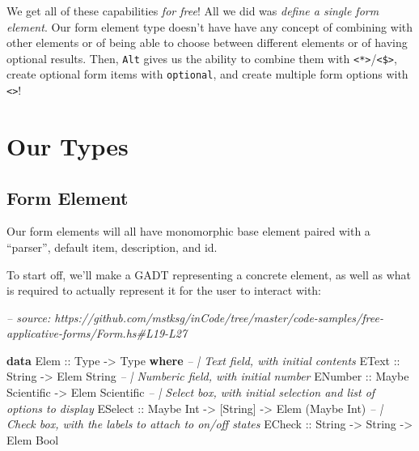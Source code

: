 \documentclass[]{article}
\newenvironment{Shaded}{}{}
\newcommand{\CommentTok}[1]{\textcolor[rgb]{0.38,0.63,0.69}{\textit{#1}}}
\newcommand{\DataTypeTok}[1]{\textcolor[rgb]{0.56,0.13,0.00}{#1}}
\newcommand{\KeywordTok}[1]{\textcolor[rgb]{0.00,0.44,0.13}{\textbf{#1}}}
\newcommand{\NormalTok}[1]{#1}
\newcommand{\OtherTok}[1]{\textcolor[rgb]{0.00,0.44,0.13}{#1}}
\begin{document}
We get all of these capabilities \emph{for free}! All we did was \emph{define a
single form element}. Our form element type doesn't have have any concept of
combining with other elements or of being able to choose between different
elements or of having optional results. Then, \texttt{Alt} gives us the ability
to combine them with
\texttt{\textless{}*\textgreater{}}/\texttt{\textless{}\$\textgreater{}}, create
optional form items with \texttt{optional}, and create multiple form options
with \texttt{\textless{}\textbar{}\textgreater{}}!

\hypertarget{our-types}{%
\section{Our Types}\label{our-types}}

\hypertarget{form-element}{%
\subsection{Form Element}\label{form-element}}

Our form elements will all have monomorphic base element paired with a
``parser'', default item, description, and id.

To start off, we'll make a GADT representing a concrete element, as well as what
is required to actually represent it for the user to interact with:

\begin{Shaded}
\begin{Highlighting}[]
\CommentTok{-- source: https://github.com/mstksg/inCode/tree/master/code-samples/free-applicative-forms/Form.hs#L19-L27}

\KeywordTok{data} \DataTypeTok{Elem}\OtherTok{ ::} \DataTypeTok{Type} \OtherTok{->} \DataTypeTok{Type} \KeywordTok{where}
    \CommentTok{-- | Text field, with initial contents}
    \DataTypeTok{EText}\OtherTok{   ::} \DataTypeTok{String}                \OtherTok{->} \DataTypeTok{Elem} \DataTypeTok{String}
    \CommentTok{-- | Numberic field, with initial number}
    \DataTypeTok{ENumber}\OtherTok{ ::} \DataTypeTok{Maybe} \DataTypeTok{Scientific}      \OtherTok{->} \DataTypeTok{Elem} \DataTypeTok{Scientific}
    \CommentTok{-- | Select box, with initial selection and list of options to display}
    \DataTypeTok{ESelect}\OtherTok{ ::} \DataTypeTok{Maybe} \DataTypeTok{Int} \OtherTok{->}\NormalTok{ [}\DataTypeTok{String}\NormalTok{] }\OtherTok{->} \DataTypeTok{Elem}\NormalTok{ (}\DataTypeTok{Maybe} \DataTypeTok{Int}\NormalTok{)}
    \CommentTok{-- | Check box, with the labels to attach to on/off states}
    \DataTypeTok{ECheck}\OtherTok{  ::} \DataTypeTok{String}    \OtherTok{->} \DataTypeTok{String}   \OtherTok{->} \DataTypeTok{Elem} \DataTypeTok{Bool}
\end{Highlighting}
\end{Shaded}
\end{document}
